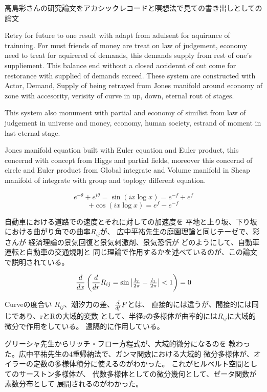 \documentclass{jsarticle}
\begin{document}
{高島彩さんの研究論文をアカシックレコードと瞑想法で見ての書き出しとしての
論文


   Retry for future to one result with adapt from adulsent for
aquirance of trainning. For must friends of money are treat on
law of judgement, economy need to treat for aquirered of demands,
this demands supply from rest of  one's suppliement.
This balance end without a closed accidennt of out come for
restorance with supplied of demands exceed.
These system are constructed with Actor, Demand, Supply of
being retrayed from Jones manifold around economy of zone
with accesority, verisity of curve in up, down, eternal
rout of stages.

    This system also monument with partial and economy of
similist from law of judgement in universe and money, economy,
human society, estrand of moment in last eternal stage.
  

   Jones manifold equation built with Euler equation and Euler product,
this concernd with concept from Higgs and partial fields,
moreover this concernd of circle and Euler product from
Global integrate and Volume manifold in Sheap manifold of integrate
with group and toplogy different equation.

$$ e^{- \theta} + e^{i \theta} = \sin (i x \log x) = e^{-f} + e^{f} $$
$$ + \cos (i x \log x) = e^{f} - e^{-f} $$

  自動車における道路での速度とそれに対しての加速度を
  平地と上り坂、下り坂における曲がり角での曲率$R_{ij}$が、
  広中平祐先生の庭園理論と同じテーゼで、彩さんが
  経済理論の景気回復と景気刺激剤、景気恐慌が
  どのようにして、自動車運転と自動車の交通規則と
  同じ理論で作用するかを述べているのが、この論文で説明されている。 


  $$ {d \over dx}\left({d \over d r}R_{ij} = \sin
	  \begin{vmatrix} {l_2 \over {2 \pi}} 
- {l_1 \over {2 \pi}}\end{vmatrix}  < 1 \right) = 0 $$


      Curveの度合い $R_{ij}$、潮汐力の差、${d \over d f}F$とは、
   直接的には違うが、間接的には同じであり、rとRの大域的変数
   として、半径rの多様体が曲率的には$R_{ij}$に大域的微分で作用をしている。
   遠隔的に作用している。


      グリーシャ先生からリッチ・フロー方程式が、大域的微分になるのを
   教わった。広中平祐先生の4重帰納法で、ガンマ関数における大域的
   微分多様体が、オイラーの定数の多様体積分に使えるのがわかった。
   これがヒルベルト空間としてのサーストン多様体が、
   代数多様体としての微分幾何として、ゼータ関数が素数分布として
   展開されるのがわかった。

}
\end{document}
